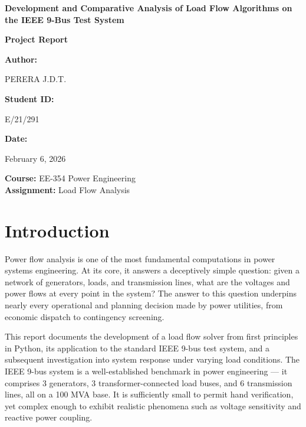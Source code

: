 \documentclass[12pt, a4paper]{article}
\begin{document}
\begin{titlepage}
    \vspace*{\fill}
    \centering
    {\Huge \textbf{Development and Comparative Analysis of Load Flow Algorithms on the IEEE 9-Bus Test System}\par}
    \vspace{1.5cm}
    {\Large \textbf{Project Report}\par}
    \vspace{2cm}
    {\Large \textbf{Author:}\par}
    {\Large PERERA J.D.T.\par}
    \vspace{0.5cm}
    {\Large \textbf{Student ID:}\par}
    {\Large E/21/291\par}
    \vspace{0.5cm}
    {\Large \textbf{Date:}\par}
    {\Large February 6, 2026\par}
    
    \vspace*{\fill}
    
    \begin{center}
        \textbf{Course:} EE-354 Power Engineering \\
        \textbf{Assignment:} Load Flow Analysis
    \end{center}
\end{titlepage}

\newpage
\tableofcontents
\newpage

\section{Introduction}
Power flow analysis is one of the most fundamental computations in power systems engineering. At its core, it answers a deceptively simple question: given a network of generators, loads, and transmission lines, what are the voltages and power flows at every point in the system? The answer to this question underpins nearly every operational and planning decision made by power utilities, from economic dispatch to contingency screening.

This report documents the development of a load flow solver from first principles in Python, its application to the standard IEEE 9-bus test system, and a subsequent investigation into system response under varying load conditions. The IEEE 9-bus system is a well-established benchmark in power engineering --- it comprises 3 generators, 3 transformer-connected load buses, and 6 transmission lines, all on a 100 MVA base. It is sufficiently small to permit hand verification, yet complex enough to exhibit realistic phenomena such as voltage sensitivity and reactive power coupling.
\end{document}
